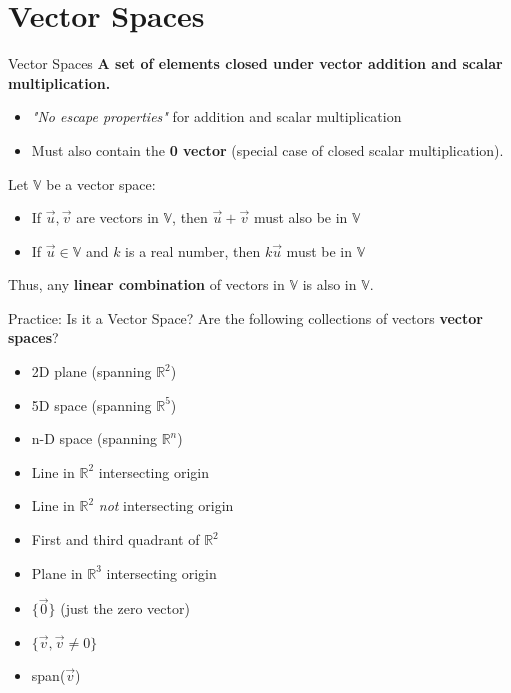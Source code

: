\section{Vector Spaces}

\begin{frame}{Vector Spaces}
    \textbf{A set of elements closed under vector addition and scalar multiplication.}
    \begin{itemize}
        \item \textit{"No escape properties"} for addition and scalar multiplication
        \item Must also contain the \textbf{0 vector} (special case of closed scalar multiplication).
    \end{itemize}
    Let $\mathbb{V}$ be a vector space:
    \begin{itemize}
        \item If $\vec{u}, \vec{v}$ are vectors in $\mathbb{V}$, then $\vec{u} + \vec{v}$ must also be in $\mathbb{V}$
        \item If $\vec{u} \in \mathbb{V}$ and $k$ is a real number, then $k\vec{u}$ must be in $\mathbb{V}$
    \end{itemize}
    Thus, any \textbf{linear combination} of vectors in $\mathbb{V}$ is also in $\mathbb{V}$.
\end{frame}

\begin{frame}{Practice: Is it a Vector Space?}
    Are the following collections of vectors \textbf{vector spaces}?
    \begin{itemize}
        \item 2D plane (spanning $\mathbb{R}^2$)
        \item 5D space (spanning $\mathbb{R}^5$)
        \item n-D space (spanning $\mathbb{R}^n$)
        \item Line in $\mathbb{R}^2$ intersecting origin
        \item Line in $\mathbb{R}^2$ \textit{not} intersecting origin
        \item First and third quadrant of $\mathbb{R}^2$
        \item Plane in $\mathbb{R}^3$ intersecting origin
        \item $\{\vec{0}\}$ (just the zero vector)
        \item $\{\vec{v}, \vec{v} \neq 0\}$ 
        \item span($\vec{v}$)
    \end{itemize}
\end{frame}

